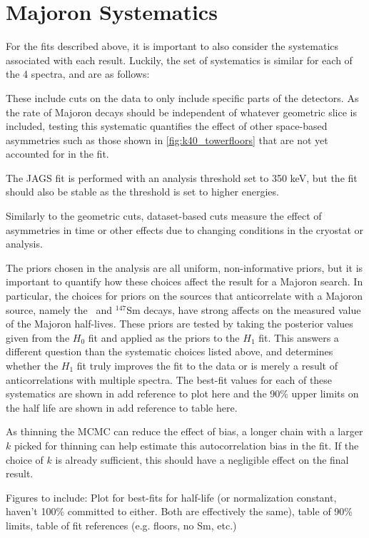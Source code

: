 \section{Majoron Systematics}
For the fits described above, it is important to also consider the systematics associated with each result.
Luckily, the set of systematics is similar for each of the 4 spectra, and are as follows:
\begin{description}[align=left]
\item [Geometric cuts] These include cuts on the data to only include specific parts of the detectors.
As the rate of Majoron decays should be independent of whatever geometric slice is included, testing this systematic quantifies the effect of other space-based asymmetries such as those shown in \autoref{fig:k40_towerfloors} that are not yet accounted for in the fit. 
\item[Analysis thresholds] The JAGS fit is performed with an analysis threshold set to 350 keV, but the fit should also be stable as the threshold is set to higher energies.
\item [Dataset-based cuts] Similarly to the geometric cuts, dataset-based cuts measure the effect of asymmetries in time or other effects due to changing conditions in the cryostat or analysis.
\item [Choice of priors] The priors chosen in the analysis are all uniform, non-informative priors, but it is important to quantify how these choices affect the result for a Majoron search.
In particular, the choices for priors on the sources that anticorrelate with a Majoron source, namely the \twonubb~and $^{147}$Sm decays, have strong affects on the measured value of the Majoron half-lives.
These priors are tested by taking the posterior values given from the $H_0$ fit and applied as the priors to the $H_1$ fit.
This answers a different question than the systematic choices listed above, and determines whether the $H_1$ fit truly improves the fit to the data or is merely a result of anticorrelations with multiple spectra.
The best-fit values for each of these systematics are shown in \color{red}add reference to plot here\color{black} and the 90\% upper limits on the half life are shown in \color{red}add reference to table here\color{black}.
\item [Fit Systematics] As thinning the MCMC can reduce the effect of bias, a longer chain with a larger $k$ picked for thinning can help estimate this autocorrelation bias in the fit.
If the choice of $k$ is already sufficient, this should have a negligible effect on the final result.

Figures to include:
Plot for best-fits for half-life (or normalization constant, haven't 100\% committed to either. Both are effectively the same), table of 90\% limits, table of fit references (e.g. floors, no Sm, etc.)
\end{description}
